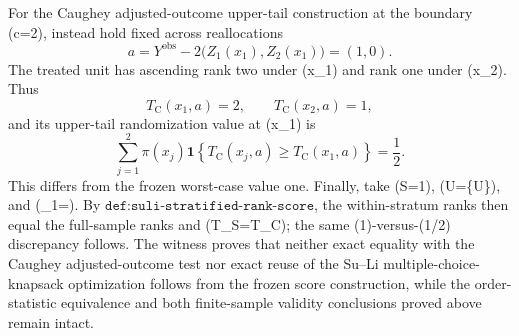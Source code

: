 For the Caughey adjusted-outcome upper-tail construction at the boundary (c=2), instead hold fixed across reallocations
\[
 a=Y^{\mathrm{obs}}-2\bigl(Z_1(x_1),Z_2(x_1)\bigr)=(1,0).
\]
The treated unit has ascending rank two under (x_1) and rank one under (x_2).  Thus
\[
 T_{\mathrm C}(x_1,a)=2,
 \qquad T_{\mathrm C}(x_2,a)=1,
\]
and its upper-tail randomization value at (x_1) is
\[
 \sum_{j=1}^{2}\pi(x_j)
 \mathbf 1\!\left\{T_{\mathrm C}(x_j,a)\geq T_{\mathrm C}(x_1,a)\right\}
 =\frac12.
\]
This differs from the frozen worst-case value one.  Finally, take (S=1), (\mathcal U=\{U\}), and (\phi_1=\phi).  By \(\texttt{def:suli-stratified-rank-score}\), the within-stratum ranks then equal the full-sample ranks and (T_{\mathrm S}=T_{\mathrm C}); the same (1)-versus-(1/2) discrepancy follows.  The witness proves that neither exact equality with the Caughey adjusted-outcome test nor exact reuse of the Su--Li multiple-choice-knapsack optimization follows from the frozen score construction, while the order-statistic equivalence and both finite-sample validity conclusions proved above remain intact.
